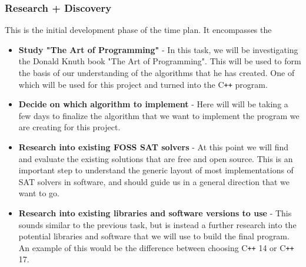 \documentclass{article}
\begin{document}
\subsubsection{Research + Discovery}
This is the initial development phase of the time plan. It encompasses the
\begin{itemize}
    \item \textbf{Study "The Art of Programming"} - In this task, we will be investigating the Donald Knuth book "The Art of Programming". This will
    be used to form the basis of our understanding of the algorithms that he has created. One of which will be used for this project and
    turned into the C\texttt{++} program.
    \item \textbf{Decide on which algorithm to implement} - Here will will be taking a few days to finalize the algorithm that we want to implement
    the program we are creating for this project.
    \item \textbf{Research into existing FOSS SAT solvers} - At this point we will find and evaluate the existing solutions that are free and open
    source. This is an important step to understand the generic layout of most implementations of SAT solvers in software, and should guide
    us in a general direction that we want to go.
    \item \textbf{Research into existing libraries and software versions to use} - This sounds similar to the previous task, but is instead a further
    research into the potential libraries and software that we will use to build the final program. An example of this would be the
    difference between choosing C\texttt{++} 14 or C\texttt{++} 17.
\end{itemize}
\end{document}
